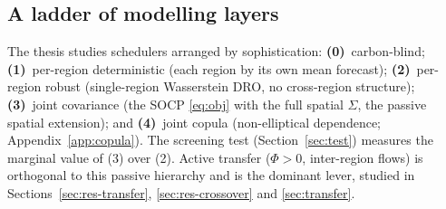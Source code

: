 \documentclass[12pt]{article}
\begin{document}
\subsection{A ladder of modelling layers}\label{sec:ladder}
The thesis studies schedulers arranged by sophistication: \textbf{(0)}~carbon-blind;
\textbf{(1)}~per-region deterministic (each region by its own mean forecast);
\textbf{(2)}~per-region robust (single-region Wasserstein DRO, no cross-region
structure); \textbf{(3)}~joint covariance (the SOCP \eqref{eq:obj} with the full
spatial $\Sigma$, the passive spatial extension); and \textbf{(4)}~joint copula
(non-elliptical dependence; Appendix~\ref{app:copula}). The screening test
(Section~\ref{sec:test}) measures the marginal value of (3) over (2). Active transfer
($\Phi>0$, inter-region flows) is orthogonal to this passive hierarchy and is the
dominant lever, studied in Sections~\ref{sec:res-transfer}, \ref{sec:res-crossover}
and \ref{sec:transfer}.
\end{document}
